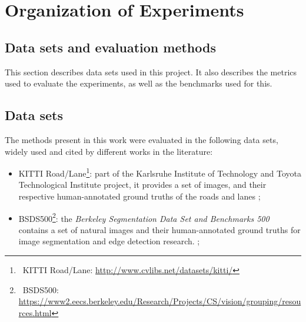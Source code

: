 \section{Organization of Experiments}
\subsection{Data sets and evaluation methods}
\label{cap5_dataset_eval}

This section describes data sets used in this project.
It also describes the metrics used to evaluate the experiments, as well as the benchmarks used for this.

\subsection{Data sets}
\label{cap5_bases_dados}

The methods present in this work were evaluated in the following data sets, widely used and cited by different works in the literature:

\begin{itemize}
 \item KITTI Road/Lane\footnote{~KITTI Road/Lane: \url{http://www.cvlibs.net/datasets/kitti/}}: part of the Karlsruhe Institute of Technology and Toyota Technological Institute project, it provides a set of images, and their respective human-annotated ground truths of the roads and lanes \cite{Fritsch2013ITSC};

 \item BSDS500\footnote{~BSDS500: \url{https://www2.eecs.berkeley.edu/Research/Projects/CS/vision/grouping/resources.html}}: the \textit{Berkeley Segmentation Data Set and Benchmarks 500} contains a set of natural images and their human-annotated ground truths for image segmentation and edge detection research. \cite{amfm_pami2011};
 
\end{itemize}

